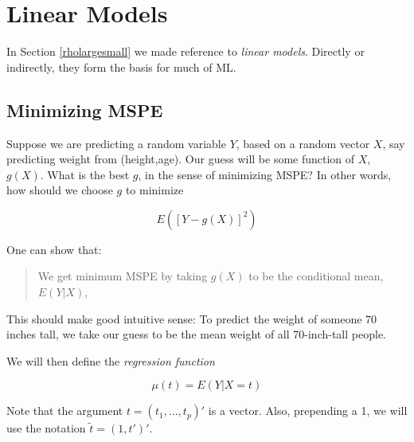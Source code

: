 \chapter{Linear Models}  
\label{chap:linmod} 

In Section \ref{rholargesmall} we made reference to \textit{linear
models}.  Directly or indirectly, they form the basis for much of ML.

\section{Minimizing MSPE}

Suppose we are predicting a random variable $Y$, based on a random
vector $X$, say predicting weight from (height,age).  Our guess will be
some function of $X$, $g(X)$.  What is the best $g$, in the sense of
minimizing MSPE?  In other words, how should we choose $g$ to minimize

\begin{equation}
\label{mspe}
E \left ( [Y - g(X)]^2 \right )
\end{equation}

% 
% 

One can show that:

\begin{quote}
We get minimum MSPE by taking $g(X)$ to be the conditional mean, $E(Y|X)$,
\end{quote}

This should make good intuitive sense:  To predict the weight of
someone 70 inches tall, we take our guess to be the mean weight of all
70-inch-tall people.

We will then define the \textit{regression function}

\begin{equation}
\mu(t) = E (Y | X = t)
\end{equation}

Note that the argument $t = (t_1,...,t_p)'$ is a vector.  
Also, prepending a 1, we will use the notation $\widetilde{t} = (1,t')'$.

